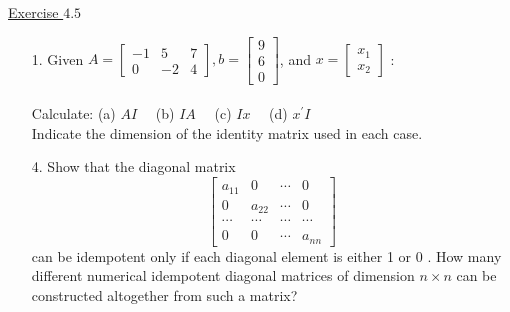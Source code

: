\documentclass{./../../Latex/handout}
\begin{document}
\underline{Exercise $4.5$}
\begin{itemize}
\item[1.] Given $A=\left[\begin{array}{rrr}-1 & 5 & 7 \\ 0 & -2 & 4\end{array}\right], b=\left[\begin{array}{l}9 \\ 6 \\ 0\end{array}\right]$, and $x=\left[\begin{array}{l}x_1 \\ x_2\end{array}\right]$ : \\~\\
Calculate: (a) $AI \quad$ (b) $I A \quad$ (c) $I x \quad$ (d) $x^{\prime} I$ \\
Indicate the dimension of the identity matrix used in each case.

\item[4.] Show that the diagonal matrix
$$
\left[\begin{array}{cccc}
a_{11} & 0 & \cdots & 0 \\
0 & a_{22} & \cdots & 0 \\
\cdots  & \cdots & \cdots & \cdots  \\
0 & 0 & \cdots & a_{n n}
\end{array}\right]
$$
can be idempotent only if each diagonal element is either 1 or 0 . How many different numerical idempotent diagonal matrices of dimension $n \times n$ can be constructed altogether from such a matrix? \\
\end{itemize}
\end{document}
